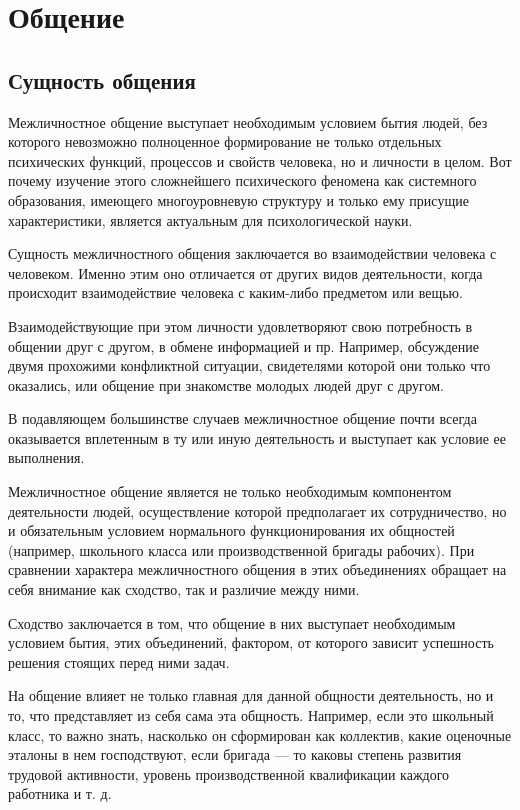 \chapter{Общение}
\section{Сущность общения}
Межличностное общение выступает необходимым условием бытия людей, без которого невозможно полноценное формирование не только отдельных психических функций, процессов и свойств человека, но и личности в целом. Вот почему изучение этого сложнейшего психического феномена как системного образования, имеющего многоуровневую структуру и только ему присущие характеристики, является актуальным для психологической науки. \cite{5}

Сущность межличностного общения заключается во взаимодействии человека с человеком. Именно этим оно отличается от других видов деятельности, когда происходит взаимодействие человека с каким-либо предметом или вещью.

Взаимодействующие при этом личности удовлетворяют свою потребность в общении друг с другом, в обмене информацией и пр. Например, обсуждение двумя прохожими конфликтной ситуации, свидетелями которой они только что оказались, или общение при знакомстве молодых людей друг с другом.

В подавляющем большинстве случаев межличностное общение почти всегда оказывается вплетенным в ту или иную деятельность и выступает как условие ее выполнения.

Межличностное общение является не только необходимым компонентом деятельности людей, осуществление которой предполагает их сотрудничество, но и обязательным условием нормального функционирования их общностей (например, школьного класса или производственной бригады рабочих). При сравнении характера межличностного общения в этих объединениях обращает на себя внимание как сходство, так и различие между ними.

Сходство заключается в том, что общение в них выступает необходимым условием бытия, этих объединений, фактором, от которого зависит успешность решения стоящих перед ними задач.

На общение влияет не только главная для данной общности деятельность, но и то, что представляет из себя сама эта общность. Например, если это школьный класс, то важно знать, насколько он сформирован как коллектив, какие оценочные эталоны в нем господствуют, если бригада — то каковы степень развития трудовой активности, уровень производственной квалификации каждого работника и т. д.

